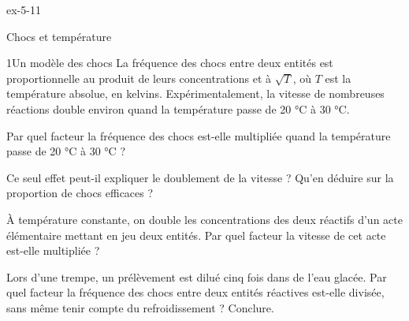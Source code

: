 \begin{blocLivre}{ex-5-11}
\begin{exercice}[2]{Chocs et température}
\begin{docu}{1}{Un modèle des chocs}
La fréquence des chocs entre deux entités est proportionnelle au produit de leurs concentrations et à $\sqrt{T}$, où
$T$ est la température absolue, en kelvins. Expérimentalement, la vitesse de nombreuses réactions double environ
quand la température passe de 20 °C à 30 °C.
\end{docu}
\begin{questions}
\item Par quel facteur la fréquence des chocs est-elle multipliée quand la température passe de 20 °C à 30 °C ?
\item Ce seul effet peut-il expliquer le doublement de la vitesse ? Qu'en déduire sur la proportion de chocs efficaces ?
\item À température constante, on double les concentrations des deux réactifs d'un acte élémentaire mettant en jeu
deux entités. Par quel facteur la vitesse de cet acte est-elle multipliée ?
\item Lors d'une trempe, un prélèvement est dilué cinq fois dans de l'eau glacée. Par quel facteur la fréquence des
chocs entre deux entités réactives est-elle divisée, sans même tenir compte du refroidissement ? Conclure.
\end{questions}
\end{exercice}
\end{blocLivre}
